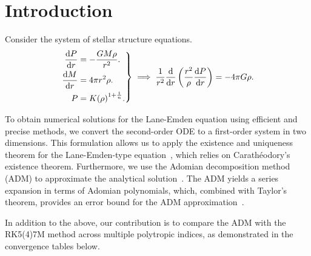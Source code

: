 \section{Introduction}

Consider the system of stellar structure equations.
\begin{equation*}
	\left.\begin{aligned}
		\diff{P}{r} & = -\frac{GM\rho}{r^{2}}.                \\
		\diff{M}{r} & = 4\pi r^{2}\rho.                       \\
		P           & = K{\left(\rho\right)}^{1+\frac{1}{n}}.
	\end{aligned}\right\}
	\implies
	\begin{aligned}
		\frac{1}{r^{2}}
		\diff*{
			\left(
			\frac{r^{2}}{\rho}\diff{P}{r}
			\right)
		}{r}=
		-4\pi G \rho.
	\end{aligned}
\end{equation*}

To obtain numerical solutions for the Lane-Emden equation using efficient and precise methods, we convert the second-order ODE to a first-order system in two dimensions.
This formulation allows us to apply the existence and uniqueness theorem for the Lane-Emden-type equation~\cite{Biles2002}, which relies on Carathéodory's existence theorem.
Furthermore, we use the Adomian decomposition method (ADM) to approximate the analytical solution~\cite{Adomian1995}.
The ADM yields a series expansion in terms of Adomian polynomials, which, combined with Taylor's theorem, provides an error bound for the ADM approximation~\cite{Umesh2021}.

In addition to the above, our contribution is to compare the ADM with the RK5(4)7M method across multiple polytropic indices, as demonstrated in the convergence tables below.


